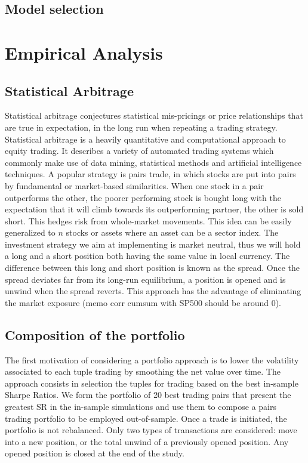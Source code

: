 \documentclass[11pt,a4,twosided,singlespacing,titlepagenumber=on]{scrreprt}
\numberwithin{equation}{chapter} %
\theoremstyle{remark}
\begin{document}
\section{Model selection}

\chapter{Empirical Analysis}
\section{Statistical Arbitrage}
Statistical arbitrage conjectures statistical mis-pricings or price relationships that are true in expectation, in the long run when repeating a trading strategy. Statistical arbitrage is a heavily quantitative and computational approach to equity trading. It describes a variety of automated trading systems which commonly make use of data mining, statistical methods and artificial intelligence techniques. A popular strategy is pairs trade, in which stocks are put into pairs by fundamental or market-based similarities. When one stock in a pair outperforms the other, the poorer performing stock is bought long with the expectation that it will climb towards its outperforming partner, the other is sold short. This hedges risk from whole-market movements. This idea can be easily generalized to $n$ stocks or assets where an asset can be a sector index. The investment strategy we aim at implementing is market neutral, thus we will hold a long and a short position both having the same value in local currency. The difference between this long and short position is known as the spread. Once the spread deviates far from its long-run equilibrium, a position is opened and is unwind when the spread reverts. This approach has the advantage of eliminating the market exposure (memo corr cumsum with SP500 should be around 0).

\section{Composition of the portfolio}
The first motivation of considering a portfolio approach is to lower the volatility associated to each tuple trading by smoothing the net value over time. The approach consists in selection the tuples for trading based on the best in-sample Sharpe Ratios. We form the portfolio of 20 best trading pairs that present the greatest SR in the in-sample simulations and use them to compose a pairs trading portfolio to be employed out-of-sample. Once a trade is initiated, the portfolio is not rebalanced. Only two types of transactions are considered: move into a new position, or the total unwind of a previously opened position. Any opened position is closed at the end of the study.
\end{document}

